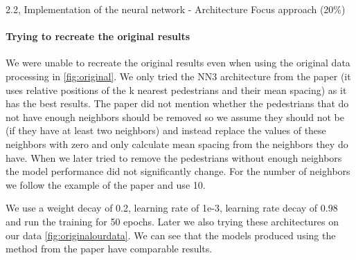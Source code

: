 \begin{task}{2.2, Implementation of the neural network - Architecture Focus approach (20\%)}
\paragraph{Trying to recreate the original results}
We were unable to recreate the original results even when using the original data processing in \ref{fig:original}. We only tried the NN3 architecture from the paper (it uses relative positions of the k nearest pedestrians and their mean spacing) as it has the best results. The paper did not mention whether the pedestrians that do not have enough neighbors should be removed so we assume they should not be (if they have at least two neighbors) and instead replace the values of these neighbors with zero and only calculate mean spacing from the neighbors they do have. When we later tried to remove the pedestrians without enough neighbors the model performance did not significantly change. For the number of neighbors we follow the example of the paper and use 10.

We use a weight decay of 0.2, learning rate of 1e-3, learning rate decay of 0.98 and run the training for 50 epochs. Later we also trying these architectures on our data \ref{fig:originalourdata}. We can see that the models produced using the method from the paper have comparable results.


\end{task}

